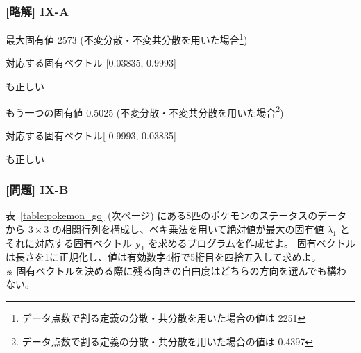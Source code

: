 \documentclass[dvipdfmx,aspectratio=169,20pt]{beamer}
\newcommand{\myfontsetting}[3]{{\fontsize{#1}{#2}\selectfont #3}}
\begin{document}
\begin{frame}
\frametitle{[略解] I\hspace{-.1em}X-A}


最大固有値 2573 
\myfontsetting{12pt}{12pt}{
(不変分散・不変共分散を用いた場合\footnote{\myfontsetting{10pt}{10pt}{ データ点数で割る定義の分散・共分散を用いた場合の値は 2251}})
}

対応する固有ベクトル [0.03835, 0.9993]

\vspace{-3mm}

\myfontsetting{12pt}{12pt}{
[-0.03835, -0.9993]も正しい
}

\vspace{2mm}

もう一つの固有値 0.5025
\myfontsetting{10pt}{10pt}{
(不変分散・不変共分散を用いた場合\footnote{\myfontsetting{10pt}{10pt}
{
データ点数で割る定義の分散・共分散を用いた場合の値は 0.4397}
})
}

対応する固有ベクトル[-0.9993,  0.03835]

\vspace{-3mm}

\myfontsetting{12pt}{12pt}{
[0.9993, -0.03835]も正しい
}

\end{frame}
\begin{frame}
\frametitle{[問題] I\hspace{-.1em}X-B}

\myfontsetting{18pt}{18pt}{
表~\ref{table:pokemon_go}
\myfontsetting{12pt}{12pt}{(次ページ)}
にある8匹のポケモンのステータスのデータから $3\times 3$ の相関行列を構成し、ベキ乗法を用いて絶対値が最大の固有値 $\lambda_1$ とそれに対応する固有ベクトル $\bm{y}_1$ を求めるプログラムを作成せよ。
固有ベクトルは長さを1に正規化し、値は有効数字4桁で5桁目を四捨五入して求めよ。%
}\\
\myfontsetting{10pt}{10pt}{
※ 固有ベクトルを決める際に残る向きの自由度はどちらの方向を選んでも構わない。
}
\end{frame}
\end{document}
